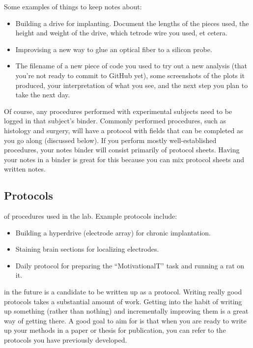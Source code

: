 \documentclass{tufte-book}
\begin{document}
Some examples of things to keep notes about:

\begin{itemize}
\item{Building a drive for implanting. Document the lengths of the
  pieces used, the height and weight of the drive, which tetrode wire
  you used, et cetera.}
\item{Improvising a new way to glue an optical fiber to a silicon
  probe.}
\item{The filename of a new piece of code you used to try out a new
  analysis (that you're not ready to commit to GitHub yet), some
  screenshots of the plots it produced, your interpretation of what
  you see, and the next step you plan to take the next day.}
\end{itemize}

Of course, any procedures performed with experimental subjects need to
be logged in that subject's binder. Commonly performed procedures,
such as histology and surgery, will have a protocol with fields that
can be completed as you go along (discussed below). If you perform
mostly well-established procedures, your notes binder will consist
primarily of protocol sheets. Having your notes in a binder is great
for this because you can mix protocol sheets and written notes.

\subsection{Protocols}

 of procedures
used in the lab. Example protocols include:

\begin{itemize}
\item{Building a hyperdrive (electrode array) for chronic implantation.}
\item{Staining brain sections for localizing electrodes.}
\item{Daily protocol for preparing the ``MotivationalT'' task and
  running a rat on it.}
\end{itemize}

 in the future is a candidate to be
written up as a protocol. Writing really good protocols takes a
substantial amount of work. Getting into the habit of writing up
something (rather than nothing) and incrementally improving them is a
great way of getting there. A good goal to aim for is that when you
are ready to write up your methods in a paper or thesis for
publication, you can refer to the protocols you have previously
developed.
\end{document}
